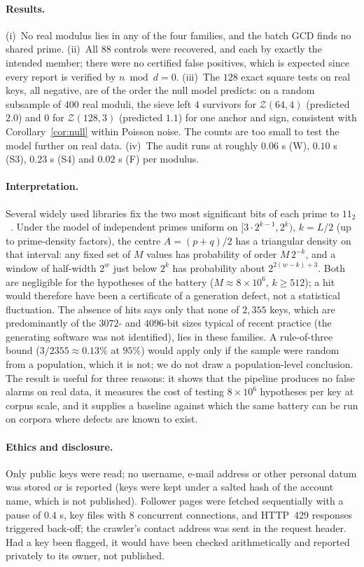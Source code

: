 \documentclass[11pt,a4paper]{article}
\begin{document}
\paragraph{Results.} (i)~No real modulus lies in any of the four families, and the batch GCD finds no shared prime. (ii)~All $88$ controls were recovered, and each by exactly the intended member; there were no certified false positives, which is expected since every report is verified by $n\bmod d=0$. (iii)~The $128$ exact square tests on real keys, all negative, are of the order the null model predicts: on a random subsample of $400$ real moduli, the sieve left $4$ survivors for $\mathcal Z(64,4)$ (predicted $2.0$) and $0$ for $\mathcal Z(128,3)$ (predicted $1.1$) for one anchor and sign, consistent with Corollary~\ref{cor:null} within Poisson noise. The counts are too small to test the model further on real data. (iv)~The audit runs at roughly $0.06$ s (W), $0.10$ s (S3), $0.23$ s (S4) and $0.02$ s (F) per modulus.

\paragraph{Interpretation.} Several widely used libraries fix the two most significant bits of each prime to $11_2$~\cite{svenda}. Under the model of independent primes uniform on $[3\cdot2^{k-1},2^k)$, $k=L/2$ (up to prime-density factors), the centre $A=(p+q)/2$ has a triangular density on that interval: any fixed set of $M$ values has probability of order $M\,2^{-k}$, and a window of half-width $2^w$ just below $2^k$ has probability about $2^{2(w-k)+3}$. Both are negligible for the hypotheses of the battery ($M\approx8\times10^{6}$, $k\ge512$); a hit would therefore have been a certificate of a generation defect, not a statistical fluctuation. The absence of hits says only that none of $2{,}355$ keys, which are predominantly of the $3072$- and $4096$-bit sizes typical of recent practice (the generating software was not identified), lies in these families. A rule-of-three bound ($3/2355\approx0.13\%$ at $95\%$) would apply only if the sample were random from a population, which it is not; we do not draw a population-level conclusion. The result is useful for three reasons: it shows that the pipeline produces no false alarms on real data, it measures the cost of testing $8\times10^{6}$ hypotheses per key at corpus scale, and it supplies a baseline against which the same battery can be run on corpora where defects are known to exist.

\paragraph{Ethics and disclosure.} Only public keys were read; no username, e-mail address or other personal datum was stored or is reported (keys were kept under a salted hash of the account name, which is not published). Follower pages were fetched sequentially with a pause of $0.4$ s, key files with $8$ concurrent connections, and HTTP~429 responses triggered back-off; the crawler's contact address was sent in the request header. Had a key been flagged, it would have been checked arithmetically and reported privately to its owner, not published.
\end{document}
